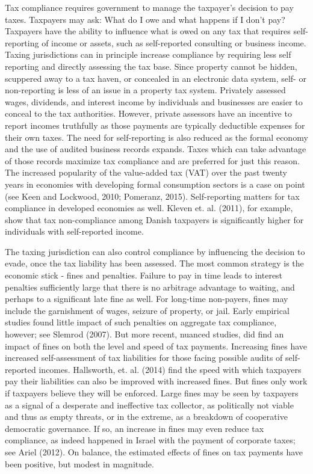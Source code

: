 \documentclass[12pt,titlepage]{article}
\begin{document}
Tax compliance requires government to manage the taxpayer's decision
to pay taxes.  Taxpayers may ask: What do I owe and what happens if I
don't pay?  Taxpayers have the ability to influence what is owed on
any tax that requires self-reporting of income or assets, such as
self-reported consulting or business income.  Taxing jurisdictions can
in principle increase compliance by requiring less self reporting and
directly assessing the tax base.  Since property cannot be hidden,
scuppered away to a tax haven, or concealed in an electronic data
system, self- or non-reporting is less of an issue in a property tax
system.  Privately assessed wages, dividends, and interest income by
individuals and businesses are easier to conceal to the tax
authorities.  However, private assessors have an incentive to report
incomes truthfully as those payments are typically deductible expenses
for their own taxes.  The need for self-reporting is also reduced as
the formal economy and the use of audited business records expands.
Taxes which can take advantage of those records maximize tax
compliance and are preferred for just this reason.  The increased
popularity of the value-added tax (VAT) over the past twenty years in
economies with developing formal consumption sectors is a case on
point (see Keen and Lockwood, 2010; Pomeranz, 2015).  Self-reporting
matters for tax compliance in developed economies as well.  Kleven
et. al. (2011), for example, show that tax non-compliance among Danish
taxpayers is significantly higher for individuals with self-reported
income.

The taxing jurisdiction can also control compliance by influencing the
decision to evade, once the tax liability has been assessed.  The most
common strategy is the economic stick - fines and penalties.  Failure
to pay in time leads to interest penalties sufficiently large that
there is no arbitrage advantage to waiting, and perhaps to a
significant late fine as well.  For long-time non-payers, fines may
include the garnishment of wages, seizure of property, or jail.  Early
empirical studies found little impact of such penalties on aggregate
tax compliance, however; see Slemrod (2007).  But more recent, nuanced
studies, did find an impact of fines on both the level and speed of
tax payments.  Increasing fines have increased self-assessment of tax
liabilities for those facing possible audits of self-reported incomes.
Hallsworth, et. al. (2014) find the speed with which taxpayers pay their liabilities can
also be improved with increased fines.  But fines only work if
taxpayers believe they will be enforced.  Large fines may be seen by
taxpayers as a signal of a desperate and ineffective tax collector, as
politically not viable and thus as empty threats, or in the extreme,
as a breakdown of cooperative democratic governance.  If so, an
increase in fines may even reduce tax compliance, as indeed happened
in Israel with the payment of corporate taxes; see Ariel (2012).  On
balance, the estimated effects of fines on tax payments have been
positive, but modest in magnitude.
\end{document}
